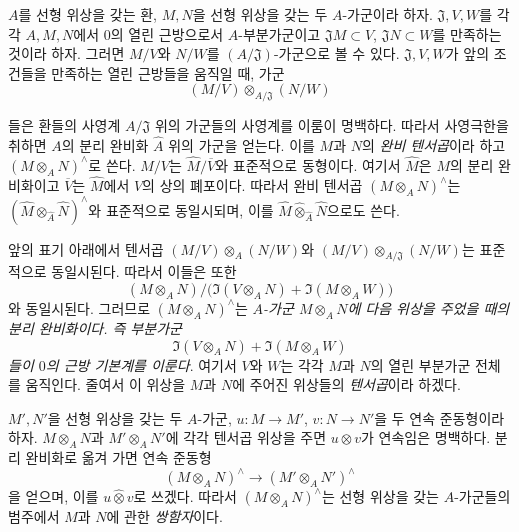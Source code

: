 \begin{env}[7.7.1]
\label{0.7.7.1-ko}
$A$를 선형 위상을 갖는 환, $M,N$을 선형 위상을 갖는 두
$A$-가군이라 하자. $\mathfrak J,V,W$를 각각 $A,M,N$에서 $0$의
열린 근방으로서 $A$-부분가군이고
$\mathfrak JM\subset V$, $\mathfrak JN\subset W$를 만족하는 것이라
하자. 그러면 $M/V$와 $N/W$를 $(A/\mathfrak J)$-가군으로 볼 수 있다.
$\mathfrak J,V,W$가 앞의 조건들을 만족하는 열린 근방들을
움직일 때, 가군
\[
  (M/V)\otimes_{A/\mathfrak J}(N/W)
\]


들은 환들의 사영계 $A/\mathfrak J$ 위의 가군들의 사영계를 이룸이
명백하다. 따라서 사영극한을 취하면 $A$의 분리 완비화
$\widehat A$ 위의 가군을 얻는다. 이를 $M$과 $N$의
\emph{완비 텐서곱}이라 하고 $(M\otimes_A N)^\wedge$로 쓴다.
$M/V$는 $\widehat M/\overline V$와 표준적으로 동형이다. 여기서
$\widehat M$은 $M$의 분리 완비화이고 $\overline V$는 $\widehat M$에서
$V$의 상의 폐포이다. 따라서 완비 텐서곱
$(M\otimes_A N)^\wedge$는
$(\widehat M\otimes_{\widehat A}\widehat N)^\wedge$와 표준적으로
동일시되며, 이를
$\widehat M\widehat\otimes_{\widehat A}\widehat N$으로도 쓴다.
\end{env}

\begin{env}[7.7.2]
\label{0.7.7.2-ko}
앞의 표기 아래에서 텐서곱
$(M/V)\otimes_A(N/W)$와
$(M/V)\otimes_{A/\mathfrak J}(N/W)$는 표준적으로 동일시된다. 따라서
이들은 또한
\[
  (M\otimes_A N)/
  \bigl(\Im(V\otimes_A N)+\Im(M\otimes_A W)\bigr)
\]
와 동일시된다. 그러므로 $(M\otimes_A N)^\wedge$는
\emph{$A$-가군 $M\otimes_A N$에 다음 위상을 주었을 때의 분리
완비화이다. 즉 부분가군}
\[
  \Im(V\otimes_A N)+\Im(M\otimes_A W)
\]
\emph{들이 $0$의 근방 기본계를 이룬다}. 여기서 $V$와 $W$는 각각
$M$과 $N$의 열린 부분가군 전체를 움직인다. 줄여서 이 위상을
$M$과 $N$에 주어진 위상들의 \emph{텐서곱}이라 하겠다.
\end{env}

\begin{env}[7.7.3]
\label{0.7.7.3-ko}
$M',N'$을 선형 위상을 갖는 두 $A$-가군,
$u:M\to M'$, $v:N\to N'$을 두 연속 준동형이라 하자. $M\otimes_A N$과
$M'\otimes_A N'$에 각각 텐서곱 위상을 주면 $u\otimes v$가 연속임은
명백하다. 분리 완비화로 옮겨 가면 연속 준동형
\[
  (M\otimes_A N)^\wedge\longrightarrow
  (M'\otimes_A N')^\wedge
\]
을 얻으며, 이를 $u\widehat\otimes v$로 쓰겠다. 따라서
$(M\otimes_A N)^\wedge$는 선형 위상을 갖는 $A$-가군들의 범주에서
$M$과 $N$에 관한 \emph{쌍함자}이다.
\end{env}

